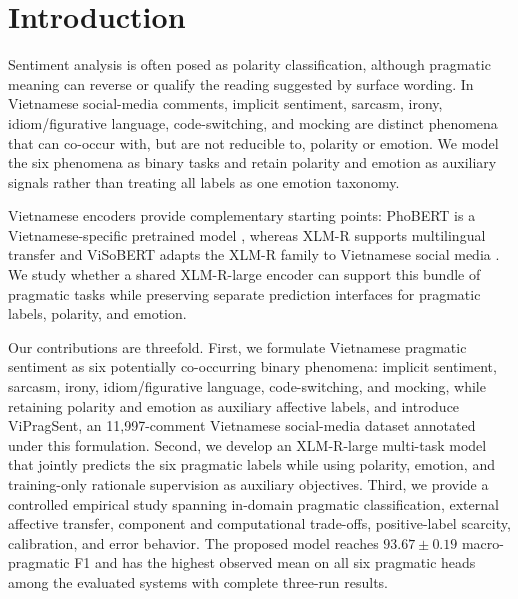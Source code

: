 \section{Introduction}

Sentiment analysis is often posed as polarity classification, although pragmatic meaning can reverse or qualify the reading suggested by surface wording. In Vietnamese social-media comments, implicit sentiment, sarcasm, irony, idiom/figurative language, code-switching, and mocking are distinct phenomena that can co-occur with, but are not reducible to, polarity or emotion. We model the six phenomena as binary tasks and retain polarity and emotion as auxiliary signals rather than treating all labels as one emotion taxonomy.

Vietnamese encoders provide complementary starting points: PhoBERT is a Vietnamese-specific pretrained model \citep{nguyen-tuan-nguyen-2020-phobert}, whereas XLM-R supports multilingual transfer \citep{conneau-etal-2020-unsupervised} and ViSoBERT adapts the XLM-R family to Vietnamese social media \citep{nguyen-etal-2023-visobert}. We study whether a shared XLM-R-large encoder can support this bundle of pragmatic tasks while preserving separate prediction interfaces for pragmatic labels, polarity, and emotion.

Our contributions are threefold. First, we formulate Vietnamese pragmatic sentiment as six potentially co-occurring binary phenomena: implicit sentiment, sarcasm, irony, idiom/figurative language, code-switching, and mocking, while retaining polarity and emotion as auxiliary affective labels, and introduce ViPragSent, an 11,997-comment Vietnamese social-media dataset annotated under this formulation. Second, we develop an XLM-R-large multi-task model that jointly predicts the six pragmatic labels while using polarity, emotion, and training-only rationale supervision as auxiliary objectives. Third, we provide a controlled empirical study spanning in-domain pragmatic classification, external affective transfer, component and computational trade-offs, positive-label scarcity, calibration, and error behavior. The proposed model reaches $93.67 \pm 0.19$ macro-pragmatic F1 and has the highest observed mean on all six pragmatic heads among the evaluated systems with complete three-run results.
